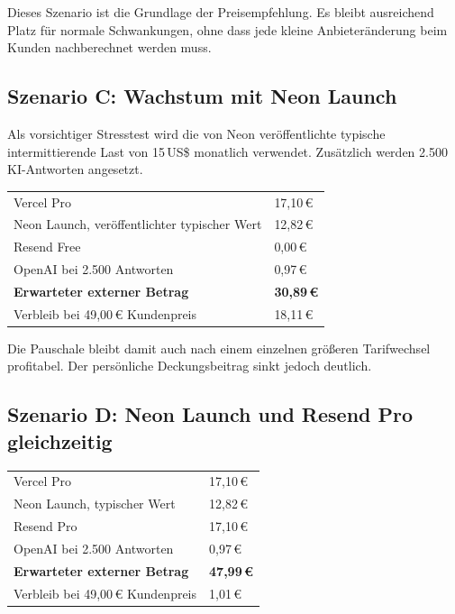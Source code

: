 \documentclass[11pt,a4paper]{article}
\newcommand{\eur}[1]{#1\,€}
\newcommand{\usd}[1]{#1\,US\$}
\begin{document}
Dieses Szenario ist die Grundlage der Preisempfehlung. Es bleibt ausreichend Platz für normale Schwankungen, ohne dass jede kleine Anbieteränderung beim Kunden nachberechnet werden muss.

\subsection{Szenario C: Wachstum mit Neon Launch}

Als vorsichtiger Stresstest wird die von Neon veröffentlichte typische intermittierende Last von \usd{15} monatlich verwendet. Zusätzlich werden 2.500 KI-Antworten angesetzt.

\begin{tabularx}{\textwidth}{Y R{30mm}}
  \toprule
  Vercel Pro & \eur{17,10} \\
  Neon Launch, veröffentlichter typischer Wert & \eur{12,82} \\
  Resend Free & \eur{0,00} \\
  OpenAI bei 2.500 Antworten & \eur{0,97} \\
  \midrule
  \sffamily\bfseries Erwarteter externer Betrag & \sffamily\bfseries\eur{30,89} \\
  Verbleib bei \eur{49,00} Kundenpreis & \eur{18,11} \\
  \bottomrule
\end{tabularx}

Die Pauschale bleibt damit auch nach einem einzelnen größeren Tarifwechsel profitabel. Der persönliche Deckungsbeitrag sinkt jedoch deutlich.

\subsection{Szenario D: Neon Launch und Resend Pro gleichzeitig}

\begin{tabularx}{\textwidth}{Y R{30mm}}
  \toprule
  Vercel Pro & \eur{17,10} \\
  Neon Launch, typischer Wert & \eur{12,82} \\
  Resend Pro & \eur{17,10} \\
  OpenAI bei 2.500 Antworten & \eur{0,97} \\
  \midrule
  \sffamily\bfseries Erwarteter externer Betrag & \sffamily\bfseries\eur{47,99} \\
  Verbleib bei \eur{49,00} Kundenpreis & \eur{1,01} \\
  \bottomrule
\end{tabularx}
\end{document}
